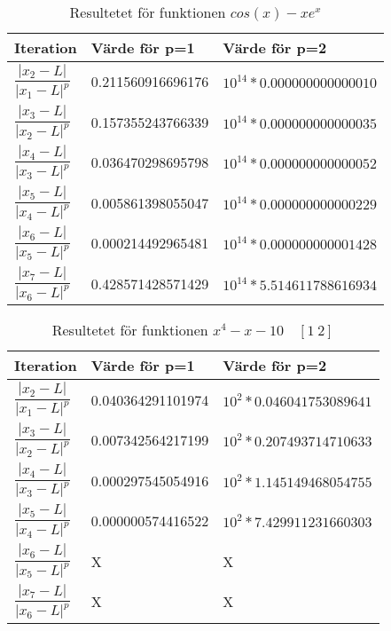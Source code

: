\documentclass[titlepage, a4paper]{article}
\begin{document}
\begin{table}[H]
  \centering
  \begin{tabular}{|l|l|l|}
    \hline
    \textbf{Iteration} & Värde för p=1  & Värde för p=2  \\ \hline
    $\dfrac{|x_{2}-L|}{{|x_1-L|}^p}$ &  0.211560916696176 & $10^{14}* 0.000000000000010$ \\ \hline
 
     $\dfrac{|x_{3}-L|}{{|x_2-L|}^p}$ & 0.157355243766339 & $10^{14}*0.000000000000035$ \\ \hline

 $\dfrac{|x_{4}-L|}{{|x_3-L|}^p}$ & 0.036470298695798 & $10^{14}*0.000000000000052$ \\ \hline
 
  $\dfrac{|x_{5}-L|}{{|x_4-L|}^p}$ & 0.005861398055047  & $10^{14}*0.000000000000229$ \\ \hline

   $\dfrac{|x_{6}-L|}{{|x_5-L|}^p}$ & 0.000214492965481 & $10^{14}*0.000000000001428$ \\ \hline

    $\dfrac{|x_{7}-L|}{{|x_6-L|}^p}$ &  0.428571428571429 & $10^{14}*5.514611788616934
$ \\ \hline
  \end{tabular}
  \caption{Resultetet för funktionen  $cos(x)-xe^x$  }
  \label{tab:funktion3}
\end{table}

\begin{table}[H]
  \centering
  \begin{tabular}{|l|l|l|}
    \hline
    \textbf{Iteration} & Värde för p=1  & Värde för p=2  \\ \hline
    $\dfrac{|x_{2}-L|}{{|x_1-L|}^p}$ & 0.040364291101974 & $10^{2}*0.046041753089641$ \\ \hline
 
     $\dfrac{|x_{3}-L|}{{|x_2-L|}^p}$ & 0.007342564217199 & $10^{2}*0.207493714710633$ \\ \hline

 $\dfrac{|x_{4}-L|}{{|x_3-L|}^p}$ & 0.000297545054916 & $10^{2}*1.145149468054755$ \\ \hline
 
  $\dfrac{|x_{5}-L|}{{|x_4-L|}^p}$ & 0.000000574416522  & $10^{2}*7.429911231660303
$ \\ \hline

   $\dfrac{|x_{6}-L|}{{|x_5-L|}^p}$ & X & X \\ \hline

    $\dfrac{|x_{7}-L|}{{|x_6-L|}^p}$ &  X & X \\ \hline
  \end{tabular}
  \caption{Resultetet för funktionen  $x^4-x-10 \quad [1 \ 2]$  }
  \label{tab:funktion4}
\end{table}
\end{document}
